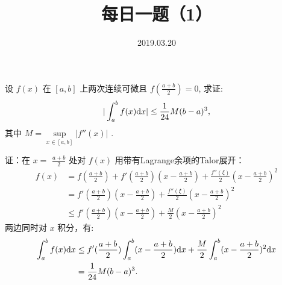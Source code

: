 \documentclass[UTF8]{ctexart}
\title{\textbf{每日一题（1）}}
\date{2019.03.20}
\begin{document}
\maketitle

设 $f(x)$ 在 $[a,b]$ 上两次连续可微且 $f(\displaystyle \frac{a+b}{2})=0$, 求证: \[ | \int_{a}^{b}f(x){\rm d}x | \leq \frac{1}{24} M (b-a)^3 ,\] 其中 $M=\sup \limits_{x \in [a,b]} |f''(x)|$ .

证：在 $x=$ $\displaystyle \frac{a+b}{2}$ 处对 $f(x)$ 用带有Lagrange余项的Talor展开：
\begin{align*}
  f(x)&=f(\frac{a+b}{2})+f'(\frac{a+b}{2})(x-\frac{a+b}{2})+\frac{f''(\xi)}{2}(x-\frac{a+b}{2})^2 \\
      &=f'(\frac{a+b}{2})(x-\frac{a+b}{2})+\frac{f''(\xi)}{2}(x-\frac{a+b}{2})^2 \\
      &\leq f'(\frac{a+b}{2})(x-\frac{a+b}{2})+\frac{M}{2}(x-\frac{a+b}{2})^2
\end{align*}
两边同时对 $x$ 积分，有:
\begin{align*}
  \int_{a}^{b}f(x){\rm d}x&\leq f'(\frac{a+b}{2})\int_{a}^{b}(x-\frac{a+b}{2}){\rm d}x + \frac{M}{2}\int_{a}^{b}(x-\frac{a+b}{2})^2 {\rm d}x  \\
   &=\frac{1}{24} M (b-a)^3.
\end{align*}
\end{document}
